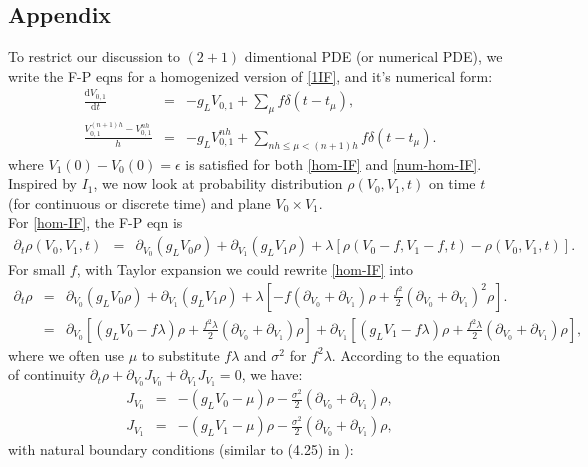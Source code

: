 \documentclass[10pt]{article}
\begin{document}
\begin{multicols}{2}
\section*{Appendix}
To restrict our discussion to $(2+1)$ dimentional PDE (or numerical PDE), we write the F-P eqns for a homogenized version of \ref{1IF}, and it's numerical form:
  \begin{eqnarray} 
\label{hom-IF}
    \frac{\mbox{d}V_{0,1}}{\mbox{d}t} &=&  - g_LV_{0,1}+\sum_{\mu}f\delta(t-t_{\mu}),      
     \\
\label{num-hom-IF}
   \frac{V^{(n+1)h}_{0,1}-V^{nh}_{0,1}}{h} &=& - g_LV^{nh}_{0,1}+\sum_{nh\leq\mu<(n+1)h}f\delta(t-t_{\mu}).
  \end{eqnarray} 
where $V_1(0) - V_0(0)= \epsilon$ is satisfied for both \ref{hom-IF} and \ref{num-hom-IF}. Inspired by {\bf{$I_1$}}, we now look at probability distribution $\rho(V_0,V_1,t)$ on time $t$ (for continuous or discrete time) and plane $V_0\times V_1$. \\
\indent
For \ref{hom-IF}, the F-P eqn is
  \begin{eqnarray}
\label{hom-FP}
\partial_t\rho(V_0,V_1,t) &=& \partial_{V_0}(g_LV_0\rho)+\partial_{V_1}(g_LV_1\rho)+\lambda[\rho(V_0-f,V_1-f,t)-\rho(V_0,V_1,t)].
  \end{eqnarray} 
For small $f$, with Taylor expansion we could rewrite \ref{hom-IF} into 
  \begin{eqnarray}
\partial_t\rho &=& \partial_{V_0}(g_LV_0\rho)+\partial_{V_1}(g_LV_1\rho)+\lambda[-f(\partial_{V_0}+\partial_{V_1})\rho+\frac{f^2}{2}(\partial_{V_0}+\partial_{V_1})^2\rho].  \nonumber\\
\label{hom-con-FP}
               &=& \partial_{V_0}[(g_LV_0-f\lambda)\rho+\frac{f^2\lambda}{2}(\partial_{V_0}+\partial_{V_1})\rho] + \partial_{V_1}[(g_LV_1-f\lambda)\rho+\frac{f^2\lambda}{2}(\partial_{V_0}+\partial_{V_1})\rho],
  \end{eqnarray}
where we often use $\mu$ to substitute $f\lambda$ and $\sigma^2$ for $f^2\lambda$. According to the equation of continuity $\partial_t\rho+\partial_{V_0}J_{V_0}+\partial_{V_1}J_{V_1}=0$, we have:
  \begin{eqnarray}
J_{V_0} &=& -(g_LV_0-\mu)\rho-\frac{\sigma^2}{2}(\partial_{V_0}+\partial_{V_1})\rho,  \nonumber\\
\label{fluxs}
J_{V_1} &=& -(g_LV_1-\mu)\rho-\frac{\sigma^2}{2}(\partial_{V_0}+\partial_{V_1})\rho,
  \end{eqnarray}
with natural boundary conditions (similar to (4.25) in \cite{FPTaoCai}):

\end{multicols}
\end{document}
